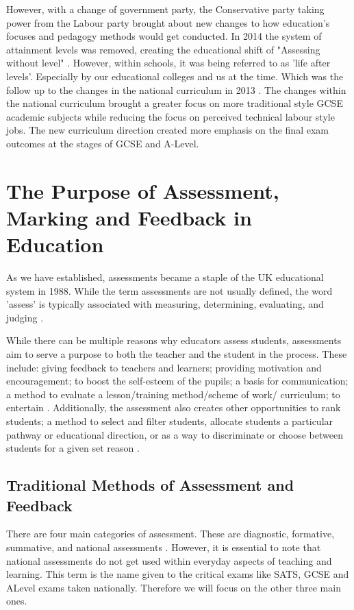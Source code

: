 	However, with a change of government party, the Conservative party taking power from the Labour party brought about new changes to how education's focuses and pedagogy methods would get conducted. In 2014 the system of attainment levels was removed, creating the educational shift of "Assessing without level" \cite{ass_without_lvls}. However, within schools, it was being referred to as 'life after levels'. Especially by our educational colleges and us at the time. Which was the follow up to the changes in the national curriculum in 2013 \cite{ass_without_lvls}. The changes within the national curriculum brought a greater focus on more traditional style GCSE academic subjects while reducing the focus on perceived technical labour style jobs. The new curriculum direction created more emphasis on the final exam outcomes at the stages of GCSE and A-Level.
	
	\section{The Purpose of Assessment, Marking and Feedback in Education}
	As we have established, assessments became a staple of the UK educational system in 1988. While the term assessments are not usually defined, the word 'assess' is typically associated with measuring, determining, evaluating, and judging \cite{wellington2007secondary}.
	
	While there can be multiple reasons why educators assess students, assessments aim to serve a purpose to both the teacher and the student in the process. These include: giving feedback to teachers and learners; providing motivation and encouragement; to boost the self-esteem of the pupils; a basis for communication; a method to evaluate a lesson/training method/scheme of work/ curriculum; to entertain \cite{wellington2007secondary}. Additionally, the assessment also creates other opportunities to rank students; a method to select and filter students, allocate students a particular pathway or educational direction, or as a way to discriminate or choose between students for a given set reason \cite{wellington2007secondary}.
	
	\subsection{Traditional Methods of Assessment and Feedback} %
	There are four main categories of assessment. These are diagnostic, formative, summative, and national assessments \cite{wellington2007secondary, dillon2011becoming}. However, it is essential to note that national assessments do not get used within everyday aspects of teaching and learning. This term is the name given to the critical exams like SATS, GCSE and ALevel exams taken nationally. Therefore we will focus on the other three main ones.
	

